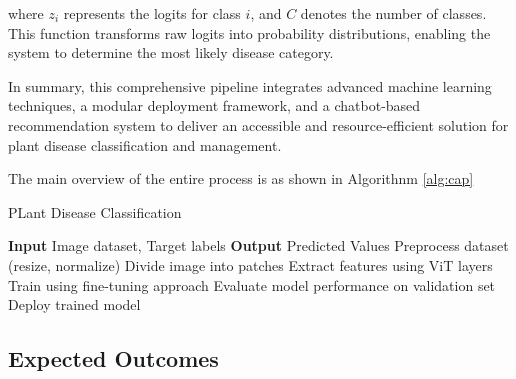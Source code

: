 where \( z_i \) represents the logits for class \( i \), and \( C \) denotes the number of classes. This function transforms raw logits into probability distributions, enabling the system to determine the most likely disease category.  

In summary, this comprehensive pipeline integrates advanced machine learning techniques, a modular deployment framework, and a chatbot-based recommendation system to deliver an accessible and resource-efficient solution for plant disease classification and management.

The main overview of the entire process is as shown in Algorithnm \ref{alg:cap}

\begin{algorithm}[h]
\caption{PLant Disease Classification }\label{alg:cap}
\begin{algorithmic}[1]
\State \textbf{Input} Image dataset, Target labels\;
\State \textbf{Output} Predicted Values\;
\State Preprocess dataset (resize, normalize)\;
\State Divide image into patches\;
\State Extract features using ViT layers\;
\State Train using fine-tuning approach\;
\State Evaluate model performance on validation set\;
\State Deploy trained model\;

\end{algorithmic} 

\end{algorithm}


\subsection{ Expected Outcomes}

